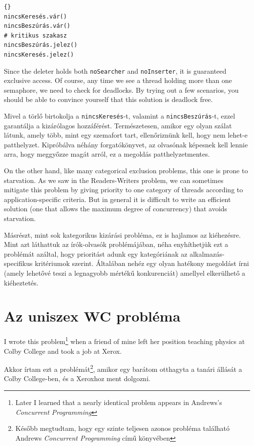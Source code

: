 \documentclass{book}
\begin{document}
\begin{lstlisting}[title={Keres-beszúr-töröl megoldás (törlők)}]{}
nincsKeresés.vár()
nincsBeszúrás.vár()
# kritikus szakasz
nincsBeszúrás.jelez()
nincsKeresés.jelez()

\end{lstlisting}
Since the deleter holds both {\tt noSearcher} and {\tt noInserter},
it is guaranteed exclusive access.  Of course, any time we see
a thread holding more than one semaphore, we need to check for
deadlocks.  By trying out a few scenarios, you should be able
to convince yourself that this solution is deadlock free.

Mivel a törlő birtokolja a {\tt nincsKeresés}-t, valamint a {\tt nincsBeszúrás}-t,
ezzel garantálja a kizárólagos  hozzáférést. Természetesen, amikor egy olyan szálat látunk,
amely több, mint egy szemafort tart,
ellenőriznünk kell, hogy nem lehet-e patthelyzet. Kipróbálva néhány forgatókönyvet,
az olvasónak képesnek kell lennie arra, hogy meggyőzze magát arról, ez a megoldás
patthelyzetmentes.

On the other hand, like many categorical exclusion problems, this
one is prone to starvation.  As we saw in the Readers-Writers problem,
we can sometimes mitigate this problem by giving priority to one
category of threads according to application-specific criteria.
But in general it is difficult to write an efficient solution
(one that allows the maximum degree of concurrency)
that avoids starvation.

Másrészt, mint sok kategorikus kizárási probléma, ez is hajlamos az kiéhezésre. 
Mint azt láthattuk az írók-olvasók problémájában, néha enyhíthetjük
ezt a problémát azáltal, hogy prioritást adunk egy kategóriának
az alkalmazás-specifikus kritériumok szerint. Általában nehéz egy olyan
hatékony megoldást írni (amely lehetővé teszi a legnagyobb mértékű konkurenciát)
amellyel elkerülhető a kiéheztetés.

\section{Az uniszex WC probléma}

I wrote this problem\footnote{Later I learned that a nearly
identical problem appears in Andrews's 
{\em Concurrent Programming}\cite{andrews}} when a friend of mine
left her position teaching physics at Colby College
and took a job at Xerox.

Akkor írtam ezt a problémát\footnote{Később megtudtam, hogy egy
szinte teljesen azonos probléma található Andrews 
{\em Concurrent Programming}\cite{andrews} című könyvében},
amikor egy barátom otthagyta a tanári állását a Colby College-ben,
és a Xeroxhoz ment dolgozni.
\end{document}
